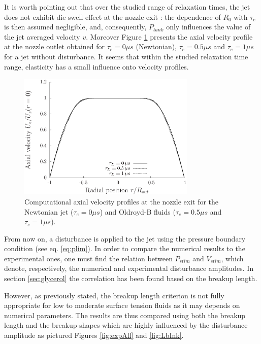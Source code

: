 \documentclass[twocolumn,10pt]{asme2ej}
\begin{document}
It is worth pointing out that over the studied range of relaxation times, the jet does not exhibit die-swell effect at the nozzle exit : the dependence of $R_0$ with $\tau_e$ is then assumed negligible, and, consequently, $P_{tank}$ only influences the value of the jet averaged velocity $v$. Moreover Figure \ref{fig:vProfiles} presents the axial velocity profile at the nozzle outlet obtained for $\tau_e = 0\mu s$ (Newtonian), $\tau_e = 0.5\mu s$ and $\tau_e = 1\mu s$ for a jet without disturbance. It seems that within the studied relaxation time range, elasticity has a small influence onto velocity profiles.

\begin{figure}[H]
    \centering
    \includegraphics[width=8.5cm]{vProfiles.eps}
    \caption{Computational axial velocity profiles at the nozzle exit for the Newtonian jet ($\tau_e = 0\mu s$) and Oldroyd-B fluids ($\tau_e = 0.5\mu s$ and $\tau_e = 1\mu s$).}
    \label{fig:vProfiles}
\end{figure}

From now on, a disturbance is applied to the jet using the pressure boundary condition (see eq. \ref{eq:plim}). In order to compare the numerical results to the experimental ones, one must find the relation between $P_{stim}$ and $V_{stim}$, which denote, respectively, the numerical and experimental disturbance amplitudes. In section \ref{sec:glycerol} the correlation has been found based on the breakup length. 

However, as previously stated, the breakup length criterion is not fully appropriate for low to moderate surface tension fluids as it may depends on numerical parameters. The results are thus compared using both the breakup length and the breakup shapes which are highly influenced by the disturbance amplitude as pictured Figures \ref{fig:expAll} and \ref{fig:LbInk}. 
\end{document}
